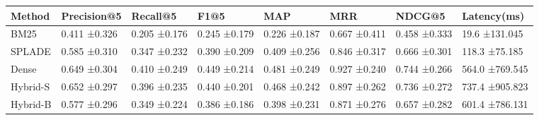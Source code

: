 \begin{tabular}{llllllll}
\toprule
Method & Precision@5 & Recall@5 & F1@5 & MAP & MRR & NDCG@5 & Latency(ms) \\
\midrule
BM25 & 0.411 ±0.326 & 0.205 ±0.176 & 0.245 ±0.179 & 0.226 ±0.187 & 0.667 ±0.411 & 0.458 ±0.333 & 19.6 ±131.045 \\
SPLADE & 0.585 ±0.310 & 0.347 ±0.232 & 0.390 ±0.209 & 0.409 ±0.256 & 0.846 ±0.317 & 0.666 ±0.301 & 118.3 ±75.185 \\
Dense & 0.649 ±0.304 & 0.410 ±0.249 & 0.449 ±0.214 & 0.481 ±0.249 & 0.927 ±0.240 & 0.744 ±0.266 & 564.0 ±769.545 \\
Hybrid-S & 0.652 ±0.297 & 0.396 ±0.235 & 0.440 ±0.201 & 0.468 ±0.242 & 0.897 ±0.262 & 0.736 ±0.272 & 737.4 ±905.823 \\
Hybrid-B & 0.577 ±0.296 & 0.349 ±0.224 & 0.386 ±0.186 & 0.398 ±0.231 & 0.871 ±0.276 & 0.657 ±0.282 & 601.4 ±786.131 \\
\bottomrule
\end{tabular}
